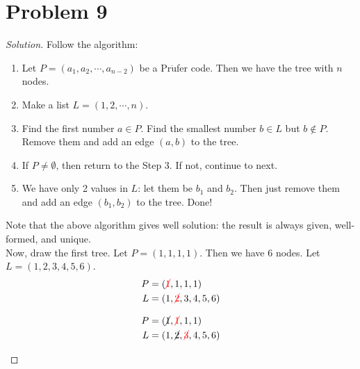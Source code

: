 \section*{Problem 9}
	\begin{proof} [Solution]
		Follow the algorithm:
		\begin{enumerate} [Step 1]
			\item Let $P = (a_1, a_2, \cdots, a_{n-2})$ be a Pr$\ddot{\text{u}}$fer code. Then we have the tree with $n$ nodes.
			\item Make a list $L = (1, 2, \cdots, n)$.
			\item Find the first number $a \in P$. Find the smallest number $b\in L$ but $b \not\in P$. Remove them and add an edge $(a, b)$ to the tree.
			\item If $P \neq \emptyset$, then return to the Step 3. If not, continue to next.
			\item We have only 2 values in $L$: let them be $b_1$ and $b_2$. Then just remove them and add an edge $(b_1, b_2)$ to the tree. Done!
		\end{enumerate}
		Note that the above algorithm gives well solution: the result is always given, well-formed, and unique.\\
		Now, draw the first tree. Let $P = (1,1,1,1)$. Then we have 6 nodes. Let $L = (1,2,3,4,5,6)$.
		\begin{align*}
			P &= ({\color{red}\cancel{1}},1,1,1)\\
			L &= (1,{\color{red}\cancel{2}},3,4,5,6)
		\end{align*}
		\begin{center}
		\end{center}
	
		\begin{align*}
			P &= (\cancel{1},{\color{red}\cancel{1}},1,1)\\
			L &= (1,\cancel{2},{\color{red}\cancel{3}},4,5,6)
		\end{align*}
		\begin{center}
		\end{center}
	

\end{proof}
